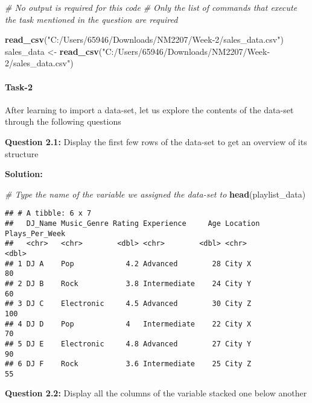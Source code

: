 \documentclass[
]{article}
\newenvironment{Shaded}{\begin{snugshade}}{\end{snugshade}}
\newcommand{\CommentTok}[1]{\textcolor[rgb]{0.56,0.35,0.01}{\textit{#1}}}
\newcommand{\FunctionTok}[1]{\textcolor[rgb]{0.13,0.29,0.53}{\textbf{#1}}}
\newcommand{\NormalTok}[1]{#1}
\newcommand{\OtherTok}[1]{\textcolor[rgb]{0.56,0.35,0.01}{#1}}
\newcommand{\StringTok}[1]{\textcolor[rgb]{0.31,0.60,0.02}{#1}}
\begin{document}
\begin{Shaded}
\begin{Highlighting}[]
\CommentTok{\# No output is required for this code}
\CommentTok{\# Only the list of commands that execute the task mentioned in the question are required}

\FunctionTok{read\_csv}\NormalTok{(}\StringTok{"C:/Users/65946/Downloads/NM2207/Week{-}2/sales\_data.csv"}\NormalTok{)}
\NormalTok{sales\_data }\OtherTok{\textless{}{-}} \FunctionTok{read\_csv}\NormalTok{(}\StringTok{"C:/Users/65946/Downloads/NM2207/Week{-}2/sales\_data.csv"}\NormalTok{) }
\end{Highlighting}
\end{Shaded}

\hypertarget{task-2}{%
\paragraph{Task-2}\label{task-2}}

After learning to import a data-set, let us explore the contents of the
data-set through the following questions

\textbf{Question 2.1:} Display the first few rows of the data-set to get
an overview of its structure

\textbf{Solution:}

\begin{Shaded}
\begin{Highlighting}[]
\CommentTok{\# Type the name of the variable we assigned the data{-}set to}
\FunctionTok{head}\NormalTok{(playlist\_data)}
\end{Highlighting}
\end{Shaded}

\begin{verbatim}
## # A tibble: 6 x 7
##   DJ_Name Music_Genre Rating Experience     Age Location Plays_Per_Week
##   <chr>   <chr>        <dbl> <chr>        <dbl> <chr>             <dbl>
## 1 DJ A    Pop            4.2 Advanced        28 City X               80
## 2 DJ B    Rock           3.8 Intermediate    24 City Y               60
## 3 DJ C    Electronic     4.5 Advanced        30 City Z              100
## 4 DJ D    Pop            4   Intermediate    22 City X               70
## 5 DJ E    Electronic     4.8 Advanced        27 City Y               90
## 6 DJ F    Rock           3.6 Intermediate    25 City Z               55
\end{verbatim}

\textbf{Question 2.2:} Display all the columns of the variable stacked
one below another
\end{document}
